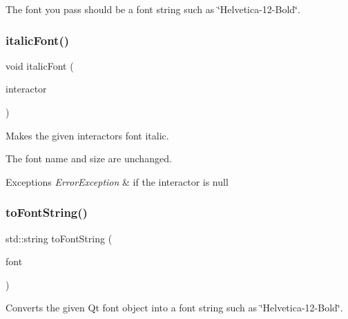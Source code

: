 The font you pass should be a font string such as \char`\"{}\+Helvetica-\/12-\/\+Bold\char`\"{}. \mbox{\label{classsgl_1_1GFont_a3f37291f3e288376754c056a10b64f90}} 
\subsubsection{\texorpdfstring{italic\+Font()}{italicFont()}}
{\footnotesize\ttfamily void italic\+Font (\begin{DoxyParamCaption}\item[{\mbox{\hyperlink{classsgl_1_1GInteractor}{G\+Interactor}} $\ast$}]{interactor }\end{DoxyParamCaption})\hspace{0.3cm}{\ttfamily [static]}}



Makes the given interactor\textquotesingle{}s font italic. 

The font name and size are unchanged. 
\begin{DoxyExceptions}{Exceptions}
{\em Error\+Exception} & if the interactor is null \\
\hline
\end{DoxyExceptions}
\mbox{\label{classsgl_1_1GFont_a1e897239fcf0fa78a33f3021a98b0029}} 
\subsubsection{\texorpdfstring{to\+Font\+String()}{toFontString()}}
{\footnotesize\ttfamily std\+::string to\+Font\+String (\begin{DoxyParamCaption}\item[{const Q\+Font \&}]{font }\end{DoxyParamCaption})\hspace{0.3cm}{\ttfamily [static]}}



Converts the given Qt font object into a font string such as \char`\"{}\+Helvetica-\/12-\/\+Bold\char`\"{}. 

\mbox{\label{classsgl_1_1GFont_aea0f70979b631219291103391bfacc6e}} 
